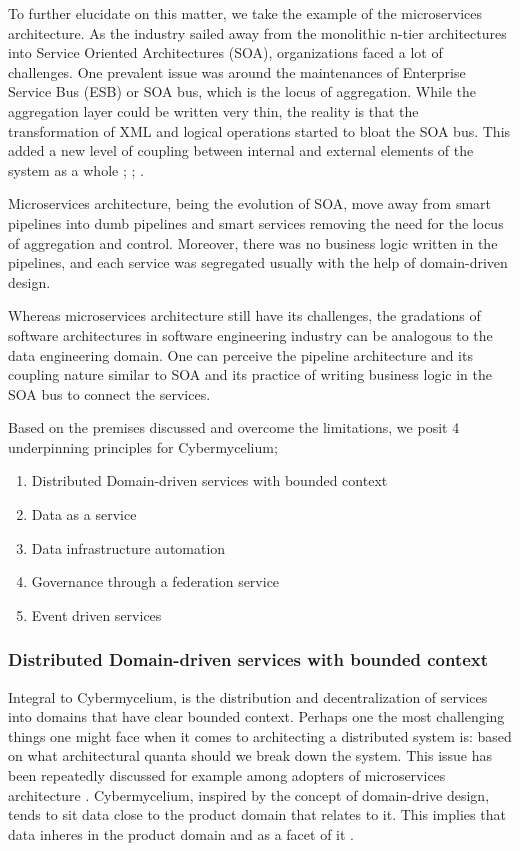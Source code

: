 \documentclass[review]{elsarticle}
\begin{document}
To further elucidate on this matter, we take the example of the microservices architecture. As the industry sailed away from the monolithic n-tier architectures into Service Oriented Architectures (SOA), organizations faced a lot of challenges. One prevalent issue was around the maintenances of Enterprise Service Bus (ESB) or SOA bus, which is the locus of aggregation. While the aggregation layer could be written very thin, the reality is that the transformation of XML and logical operations started to bloat the SOA bus. This added a new level of coupling between internal and external elements of the system as a whole \cite{di2017architecting}; \cite{zimmermann2017microservices}; \cite{waseem2020systematic}.

Microservices architecture, being the evolution of SOA, move away from smart pipelines into dumb pipelines and smart services removing the need for the locus of aggregation and control. Moreover, there was no business logic written in the pipelines, and each service was segregated usually with the help of domain-driven design.

Whereas microservices architecture still have its challenges, the gradations of software architectures in software engineering industry can be analogous to the data engineering domain. One can perceive the pipeline architecture and its coupling nature similar to SOA and its practice of writing business logic in the SOA bus to connect the services. 

Based on the premises discussed and overcome the limitations, we posit 4 underpinning principles for Cybermycelium;

\begin{enumerate}
    \item Distributed Domain-driven services with bounded context
    \item Data as a service
    \item Data infrastructure automation
    \item Governance through a federation service
    \item Event driven services

\end{enumerate}

\subsubsection{Distributed Domain-driven services with bounded context}

Integral to Cybermycelium, is the distribution and decentralization of services into domains that have clear bounded context. Perhaps one the most challenging things one might face when it comes to architecting a distributed system is: based on what architectural quanta should we break down the system. This issue has been repeatedly discussed for example among adopters of microservices architecture . Cybermycelium, inspired by the concept of domain-drive design, tends to sit data close to the product domain that relates to it. This implies that data inheres in the product domain and as a facet of it \cite{laigner2021data}.
\end{document}
